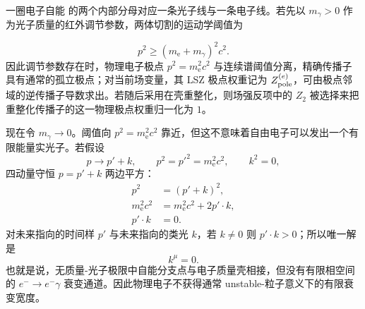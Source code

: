 \begin{derivation}
一圈电子自能  的两个内部分母对应一条光子线与一条电子线。若先以 $m_\gamma>0$ 作为光子质量的红外调节参数，两体切割的运动学阈值为

\begin{equation*}
 p^2\ge (m_{\mathrm e}+m_\gamma)^2c^2.
 \end{equation*}
因此调节参数存在时，物理电子极点 $p^2=m_{\mathrm e}^2c^2$ 与连续谱阈值分离，精确传播子具有通常的孤立极点；对当前场变量，其 LSZ 极点权重记为 $Z_{\rm pole}^{(e)}$，可由极点邻域的逆传播子导数求出。若随后采用在壳重整化，则场强反项中的 $Z_2$ 被选择来把重整化传播子的这一物理极点权重归一化为 $1$。

现在令 $m_\gamma\to0$。阈值向 $p^2=m_{\mathrm e}^2c^2$ 靠近，但这不意味着自由电子可以发出一个有限能量实光子。若假设
\begin{equation*}
 p\to p'+k,
 \qquad
 p^2=p'^2=m_{\mathrm e}^2c^2,
 \qquad
 k^2=0,
\end{equation*}
四动量守恒 $p=p'+k$ 两边平方：
\begin{align*}
 p^2
 &=(p'+k)^2,\\
 m_{\mathrm e}^2c^2
 &=m_{\mathrm e}^2c^2+2p'\!\cdot k,\\
 p'\!\cdot k&=0.
\end{align*}
对未来指向的时间样 $p'$ 与未来指向的类光 $k$，若 $k\neq0$ 则 $p'\!\cdot k>0$；所以唯一解是
\begin{equation*}
 {k^\mu=0.}
 \end{equation*}
也就是说，无质量-光子极限中自能分支点与电子质量壳相接，但没有有限相空间的 $e^-\to e^-\gamma$ 衰变通道。因此物理电子不获得通常 unstable-粒子意义下的有限衰变宽度。
\end{derivation}

